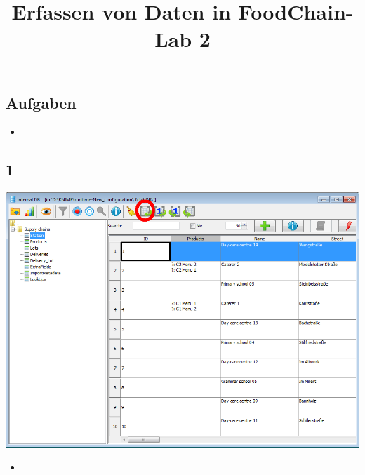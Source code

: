 \documentclass{beamer}
\title{Erfassen von Daten in FoodChain-Lab 2}
\date{}
\begin{document}
\maketitle

\section{ }

\subsection{Aufgaben}
\begin{frame}
	\begin{itemize}
		\item
	\end{itemize}
\end{frame}
 
\subsection{1}
\begin{frame}
	\begin{center}
  		\includegraphics[height=0.6\textheight]{1.png}
	\end{center}
	\begin{itemize}
		\item
	\end{itemize}
\end{frame}
\end{document}

